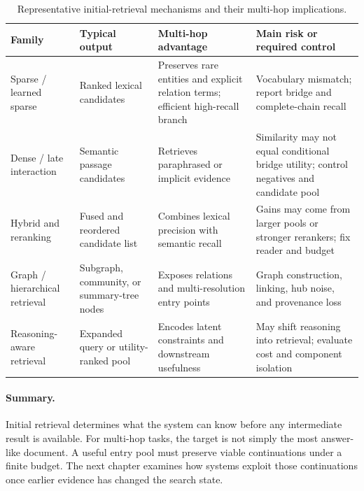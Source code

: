 \begin{table}[tbp]
\centering
\caption{Representative initial-retrieval mechanisms and their multi-hop implications.}
\label{tab:initial_retrieval_mechanisms}
\small
\begin{tabularx}{\textwidth}{@{}p{2.8cm}p{3.0cm}Y Y@{}}
\toprule
Family & Typical output & Multi-hop advantage & Main risk or required control \\
\midrule
Sparse / learned sparse & Ranked lexical candidates & Preserves rare entities and explicit relation terms; efficient high-recall branch & Vocabulary mismatch; report bridge and complete-chain recall \\
Dense / late interaction & Semantic passage candidates & Retrieves paraphrased or implicit evidence & Similarity may not equal conditional bridge utility; control negatives and candidate pool \\
Hybrid and reranking & Fused and reordered candidate list & Combines lexical precision with semantic recall & Gains may come from larger pools or stronger rerankers; fix reader and budget \\
Graph / hierarchical retrieval & Subgraph, community, or summary-tree nodes & Exposes relations and multi-resolution entry points & Graph construction, linking, hub noise, and provenance loss \\
Reasoning-aware retrieval & Expanded query or utility-ranked pool & Encodes latent constraints and downstream usefulness & May shift reasoning into retrieval; evaluate cost and component isolation \\
\bottomrule
\end{tabularx}
\end{table}

\paragraph{Summary.}
Initial retrieval determines what the system can know before any intermediate result is available. For multi-hop tasks, the target is not simply the most answer-like document. A useful entry pool must preserve viable continuations under a finite budget. The next chapter examines how systems exploit those continuations once earlier evidence has changed the search state.

